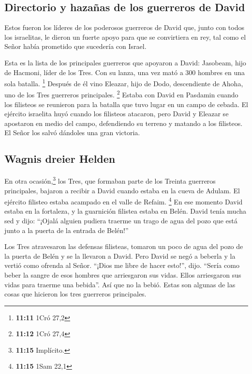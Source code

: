 \hypertarget{directorio-y-hazauxf1as-de-los-guerreros-de-david}{%
\subsection{Directorio y hazañas de los guerreros de
David}\label{directorio-y-hazauxf1as-de-los-guerreros-de-david}}

 Estos fueron los líderes de los poderosos guerreros de
David que, junto con todos los israelitas, le dieron un fuerte apoyo
para que se convirtiera en rey, tal como el Señor había prometido que
sucedería con Israel.

 Esta es la lista de los principales guerreros que
apoyaron a David: Jasobeam, hijo de Hacmoni, líder de los Tres. Con su
lanza, una vez mató a 300 hombres en una sola batalla. \footnote{\textbf{11:11}
  1Cró 27,2}  Después de él vino Eleazar, hijo de Dodo,
descendiente de Ahoha, uno de los Tres guerreros principales.
\footnote{\textbf{11:12} 1Cró 27,4}  Estaba con David en
Pasdamin cuando los filisteos se reunieron para la batalla que tuvo
lugar en un campo de cebada. El ejército israelita huyó cuando los
filisteos atacaron,  pero David y Eleazar se apostaron en
medio del campo, defendiendo su terreno y matando a los filisteos. El
Señor los salvó dándoles una gran victoria.

\hypertarget{wagnis-dreier-helden}{%
\subsection{Wagnis dreier Helden}\label{wagnis-dreier-helden}}

 En otra ocasión,\footnote{\textbf{11:15} Implícito.} los
Tres, que formaban parte de los Treinta guerreros principales, bajaron a
recibir a David cuando estaba en la cueva de Adulam. El ejército
filisteo estaba acampado en el valle de Refaim. \footnote{\textbf{11:15}
  1Sam 22,1}  En ese momento David estaba en la
fortaleza, y la guarnición filistea estaba en Belén. 
David tenía mucha sed y dijo: ``¡Ojalá alguien pudiera traerme un trago
de agua del pozo que está junto a la puerta de la entrada de Belén!''

 Los Tres atravesaron las defensas filisteas, tomaron un
poco de agua del pozo de la puerta de Belén y se la llevaron a David.
Pero David se negó a beberla y la vertió como ofrenda al Señor.
 ``¡Dios me libre de hacer esto!'', dijo. ``Sería como
beber la sangre de esos hombres que arriesgaron sus vidas. Ellos
arriesgaron sus vidas para traerme una bebida''. Así que no la bebió.
Estas son algunas de las cosas que hicieron los tres guerreros
principales.


